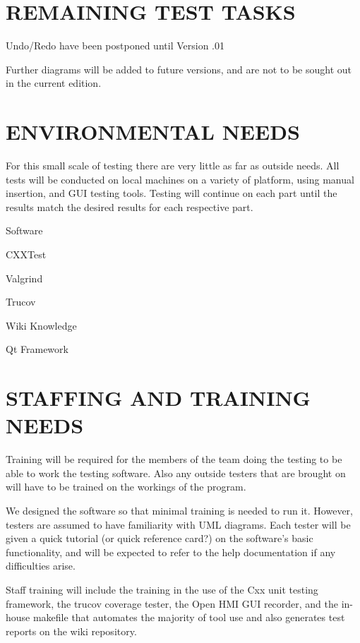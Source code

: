 \documentclass[twoside,letterpaper]{article}
\begin{document}
\section[REMAINING TEST TASKS]{\bfseries\color{black} REMAINING TEST TASKS}
{\color{black}
\begin{list}{-}{ }
\item Undo/Redo have been postponed until Version .01
\item Further diagrams will be added to future versions, and are not to be sought out in the current edition.
\end{list}
}

\section[ENVIRONMENTAL NEEDS]{\bfseries\color{black} ENVIRONMENTAL NEEDS}
{\color{black}
For this small scale of testing there are very little as far as outside needs. All tests will be conducted on local machines on a variety of platform, using manual insertion, and GUI testing tools. Testing will continue on each part until the results match the desired results for each respective part.

\begin{list}{-}{ }
\item Software
\begin{list}{-}{ }
\item CXXTest
\item Valgrind
\item Trucov
\item Wiki Knowledge
\item Qt Framework
\end{list}
\end{list}
}

\section[STAFFING AND TRAINING NEEDS]{\bfseries\color{black}
	 STAFFING AND TRAINING NEEDS}
{\color{black}
Training will be required for the members of the team doing the testing to be able to work the testing software. Also any outside testers that are brought on will have to be trained on the workings of the program.

We designed the software so that minimal training is needed to run it. However, testers are assumed to have familiarity with UML diagrams. Each tester will be given a quick tutorial (or quick reference card?) on the software's basic functionality, and will be expected to refer to the help documentation if any difficulties arise.

Staff training will include the training in the use of the Cxx unit testing framework, the trucov coverage tester, the Open HMI GUI recorder, and the in-house makefile that automates the majority of tool use and also generates test reports on the wiki repository.

 
}
\end{document}
